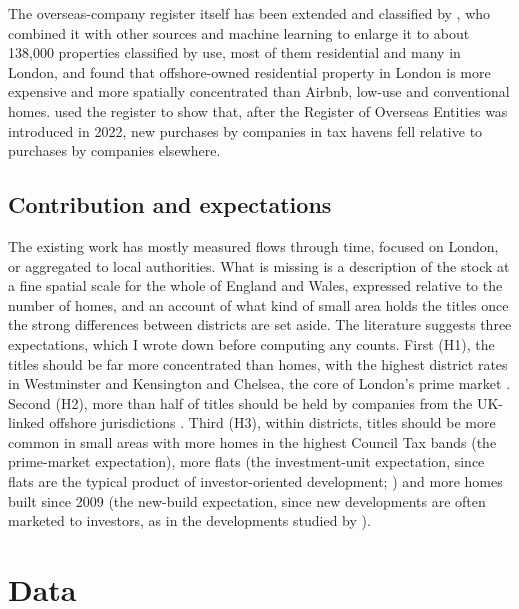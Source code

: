 \documentclass[11pt,a4paper]{article}
\begin{document}
The overseas-company register itself has been extended and classified by \citet{bourne2022}, who combined it with other sources and machine learning to enlarge it to about 138,000 properties classified by use, most of them residential and many in London, and found that offshore-owned residential property in London is more expensive and more spatially concentrated than Airbnb, low-use and conventional homes. \citet{collin2025} used the register to show that, after the Register of Overseas Entities was introduced in 2022, new purchases by companies in tax havens fell relative to purchases by companies elsewhere.

\subsection{Contribution and expectations}
The existing work has mostly measured flows through time, focused on London, or aggregated to local authorities. What is missing is a description of the stock at a fine spatial scale for the whole of England and Wales, expressed relative to the number of homes, and an account of what kind of small area holds the titles once the strong differences between districts are set aside. The literature suggests three expectations, which I wrote down before computing any counts. First (H1), the titles should be far more concentrated than homes, with the highest district rates in Westminster and Kensington and Chelsea, the core of London's prime market \citep{fernandez2016,burrows2017}. Second (H2), more than half of titles should be held by companies from the UK-linked offshore jurisdictions \citep{haberly2015a,bomare2022}. Third (H3), within districts, titles should be more common in small areas with more homes in the highest Council Tax bands (the prime-market expectation), more flats (the investment-unit expectation, since flats are the typical product of investor-oriented development; \citealp{tiuk2017}) and more homes built since 2009 (the new-build expectation, since new developments are often marketed to investors, as in the developments studied by \citealp{tiuk2017}).

\section{Data}\label{sec:data}
\end{document}
